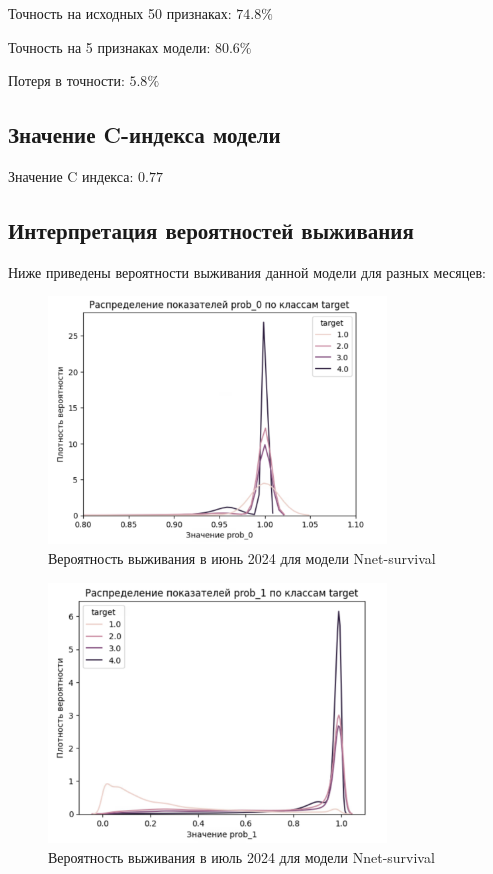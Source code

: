\documentclass[a4paper,14pt,oneside,openany]{memoir}
\begin{document}
Точность на исходных 50 признаках: $74.8\%$

Точность на 5 признаках модели: $80.6\%$

Потеря в точности: $5.8\%$

\subsection{Значение C-индекса модели}

Значение C индекса: $0.77$

\subsection{Интерпретация вероятностей выживания}

Ниже приведены вероятности выживания данной модели для разных месяцев: 

\begin{figure}[H]
	\includegraphics[width=0.8\textwidth]{../figures/prob_0_nnet.png}
	\caption{Вероятность выживания в июнь 2024 для модели Nnet-survival}
\end{figure}

\begin{figure}[H]
	\includegraphics[width=0.8\textwidth]{../figures/prob_1_nnet.png}
	\caption{Вероятность выживания в июль 2024 для модели Nnet-survival}
\end{figure}
\end{document}
